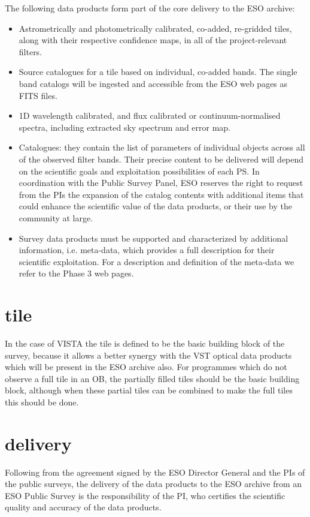 \documentclass[a4paper,10pt]{book}
\begin{document}
The following data products form part of the core delivery to the ESO archive:
\begin{itemize}
\item
    Astrometrically and photometrically calibrated, co-added, re-gridded tiles, along with their respective confidence maps, in all of the project-relevant filters.
\item
    Source catalogues for a tile based on individual, co-added bands. The single band catalogs will be ingested and accessible from the ESO web pages as FITS files.
\item
    1D wavelength calibrated, and flux calibrated or continuum-normalised spectra, including extracted sky spectrum and error map.
\item
    Catalogues: they contain the list of parameters of individual objects across all of the observed filter bands. Their precise content to be delivered will depend on the scientific goals and exploitation possibilities of each PS. In coordination with the Public Survey Panel, ESO reserves the right to request from the PIs the expansion of the catalog contents with additional items that could enhance the scientific value of the data products, or their use by the community at large.
\item
    Survey data products must be supported and characterized by additional information, i.e. meta-data, which provides a full description for their scientific exploitation. For a description and definition of the meta-data we refer to the Phase 3 web pages.
\end{itemize}


\section{tile}
In the case of VISTA the tile is defined to be the basic building block of the survey, because it allows a better synergy with the VST optical data products which will be present in the ESO archive also. For programmes which do not observe a full tile in an OB, the partially filled tiles should be the basic building block, although when these partial tiles can be combined to make the full tiles this should be done.

\section{delivery}
Following from the agreement signed by the ESO Director General and the PIs of the public surveys, the delivery of the data products to the ESO archive from an ESO Public Survey is the responsibility of the PI, who certifies the scientific quality and accuracy of the data products.
\end{document}
